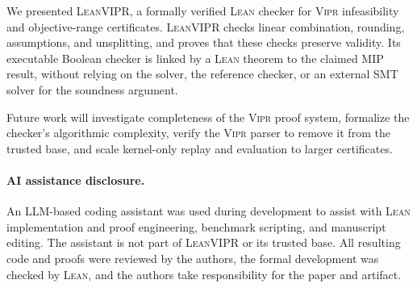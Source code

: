 \documentclass{article}
\newcommand{\tool}{\textsc{LeanVIPR}}
\newcommand{\vipr}{\textsc{Vipr}}
\newcommand{\lean}{\textsc{Lean}}
\begin{document}
We presented \tool{}, a formally verified \lean{} checker for \vipr{}
infeasibility and objective-range certificates.
\tool{} checks linear combination, rounding, assumptions, and unsplitting, and proves that these checks preserve validity.
Its executable Boolean checker is linked by a \lean{} theorem to the claimed MIP
result, without relying on the solver, the reference checker, or an external
SMT solver for the soundness argument.

Future work will investigate completeness of the \vipr{} proof system,
formalize the checker's algorithmic complexity, verify the \vipr{} parser to
remove it from the trusted base, and scale kernel-only replay and evaluation to
larger certificates.

\paragraph{AI assistance disclosure.}
An LLM-based coding assistant was used during development to assist with
\lean{} implementation and proof engineering, benchmark scripting, and
manuscript editing. The assistant is not part of \tool{} or its trusted base.
All resulting code and proofs were reviewed by the authors, the formal
development was checked by \lean{}, and the authors take responsibility for
the paper and artifact.





\newpage
% 
\end{document}
